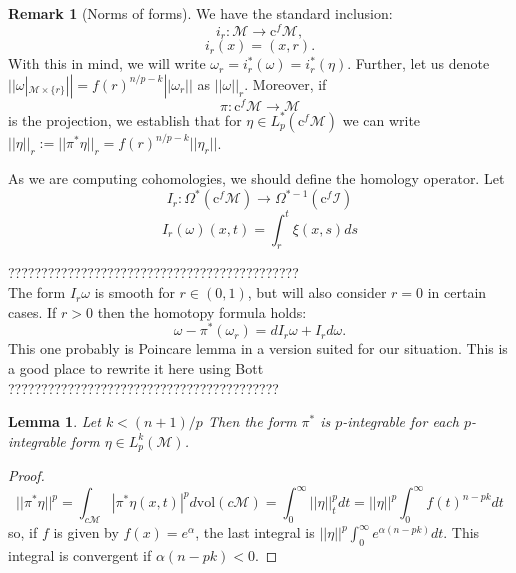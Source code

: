 \documentclass[licencjacka]{pracamgr}
\theoremstyle{definition}
\theoremstyle{definition}
\newtheorem{remark}{Remark}[section]
\theoremstyle{plain}
\newtheorem{lemma}{Lemma}[section]
\theoremstyle{plain}
\begin{document}

\begin{remark}[Norms of forms]
We have the standard inclusion:
\[
    i_r: \mathcal{M} \rightarrow \mathrm{c}^f \mathcal{M},
\]
\[
    i_r(x) = (x, r).
\]
With this in mind, we will write $\omega_r = i_r^\ast(\omega) =
i_r^\ast(\eta)$. Further, let us
 denote $|| \omega |_{\mathcal{M} \times
  \{r\}} || = f(r)^{n/p - k} ||\omega_r||$ as $|| \omega ||_r $. Moreover, if
\[
    \pi:\mathrm{c}^f \mathcal{M} \rightarrow \mathcal{M}
\]
is the projection, we establish that for $\eta \in L^\ast_p(\mathrm{c}^f\mathcal{M})$
we can write $||\eta||_r := ||\pi^\ast\eta||_r = f(r)^{n/p - k} ||\eta_r||$.
\end{remark}



As we are computing cohomologies, we should define the homology operator. Let
\[
  I_r: \Omega^\ast( \mathrm{c}^f \mathcal{M} ) \rightarrow
  \Omega^{\ast-1}(\mathrm{c}^f \mathcal{I} ) 
\]
\[
    I_r(\omega)(x, t) = \int_r^t \xi(x, s) ds
\]

????????????????????????????????????????????\\

The form $I_r\omega$ is smooth for $r \in (0,1)$, but will also consider
$r=0$ in certain cases. If $r>0$ then the homotopy formula holds:
\[
    \omega - \pi^\ast(\omega_r) = d I_r\omega + I_rd\omega.
\] 
This one probably is Poincare lemma in a version suited for our situation.
This is a good place to rewrite it here using Bott \\ 
????????????????????????????????????????? \\

\begin{lemma}
Let $k < (n+1)/p $ Then the form $\pi^\ast$ is $p$-integrable for each 
$p$-integrable form $\eta \in L^k_p(\mathcal{M})$. 
\end{lemma}
\begin{proof}
\[
    ||\pi^\ast \eta ||^p = 
    \int_{c \mathcal{M}} |\pi^\ast \eta(x,t)|^p d \mathrm{vol}(c\mathcal{M}) = 
    \int_0^\infty ||\eta||_t^p dt = ||\eta||^p \int_0^\infty f(t)^{n-pk} dt
\]
so, if $f$ is given by $f(x) = e^\alpha$, the last integral is  
$ ||\eta||^p \int_0^\infty e^{\alpha (n-pk)} dt$. This integral is convergent
if $\alpha (n - pk) < 0$.
\end{proof}
\end{document}
